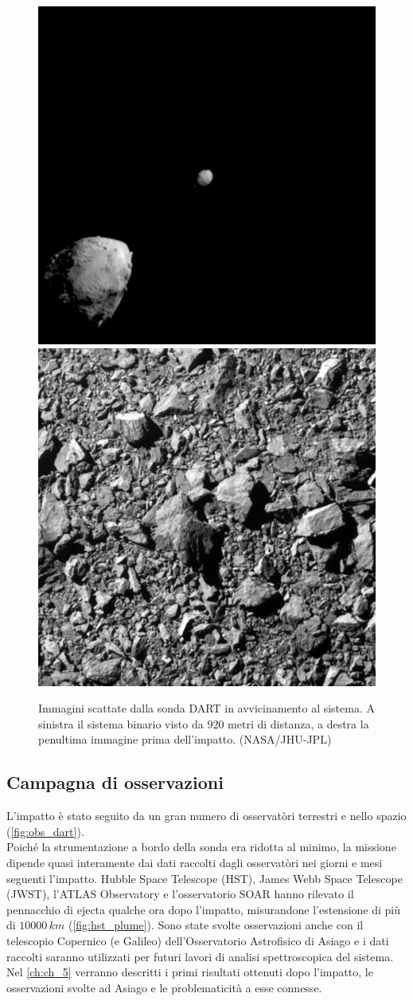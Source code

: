 \documentclass[a4paper,11pt,openright]{book}
\begin{document}
\begin{figure}[!h]
\centering
	{\includegraphics[width=.48\textwidth]{figure/920.png}} \quad
	{\includegraphics[width=.48\textwidth]{figure/penultima_dart.png}}
\caption[Immagini scattate dalla sonda DART in avvicinamento al sistema.]{Immagini scattate dalla sonda DART in avvicinamento al sistema. A sinistra il sistema binario visto da 920 metri di distanza, a destra la penultima immagine prima dell'impatto. (NASA/JHU-JPL)}
\label{fig:920_penultima_dart}
\end{figure}

\subsection{Campagna di osservazioni}
L'impatto è stato seguito da un gran numero di osservatòri terrestri e nello spazio (\cref{fig:obs_dart}).\\
Poiché la strumentazione a bordo della sonda era ridotta al minimo, la missione dipende quasi interamente dai dati raccolti dagli osservatòri nei giorni e mesi seguenti l'impatto.
Hubble Space Telescope (HST), James Webb Space Telescope (JWST), l'ATLAS Observatory e l'osservatorio SOAR hanno rilevato il pennacchio di ejecta qualche ora dopo l'impatto, misurandone l'estensione di più di $10000\,km$ (\cref{fig:hst_plume}). Sono state svolte osservazioni anche con il telescopio Copernico (e Galileo) dell'Osservatorio Astrofisico di Asiago e i dati raccolti saranno utilizzati per futuri lavori di analisi spettroscopica del sistema.\\
Nel \cref{ch:ch_5} verranno descritti i primi risultati ottenuti dopo l'impatto, le osservazioni svolte ad Asiago e le problematicità a esse connesse.
\end{document}
